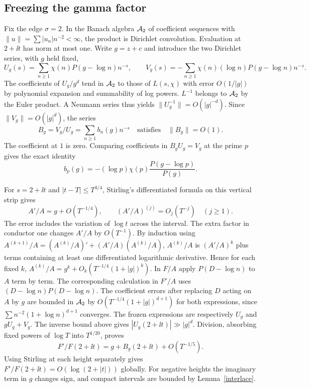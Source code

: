 \documentclass[11pt,letterpaper]{article}
\begin{document}
\subsection{Freezing the gamma factor}
Fix the edge $\sigma=2$. In the Banach algebra $\mathcal A_2$ of coefficient
sequences with $\|u\|=\sum |u_n|n^{-2}<\infty$, the product is Dirichlet
convolution. Evaluation at $2+\ii t$ has norm at most one. Write
$g=z+c$ and introduce the two Dirichlet series, with $g$ held fixed,
\[
 U_g(s)=\sum_{n\ge1}\chi(n)P(g-\log n)n^{-s},\qquad
 V_g(s)=-\sum_{n\ge1}\chi(n)(\log n)P(g-\log n)n^{-s}.
\]
The coefficients of $U_g/g^d$ tend in $\mathcal A_2$ to those of $L(s,\chi)$
with error $O(1/|g|)$ by polynomial expansion and summability of log
powers. $L^{-1}$ belongs to $\mathcal A_2$ by the Euler product. A Neumann
series thus yields $\|U_g^{-1}\|=O(|g|^{-d})$. Since
$\|V_g\|=O(|g|^d)$, the series
\[
 B_g=V_g/U_g=\sum_{n\ge1} b_n(g)n^{-s}
 \quad\text{satisfies}\quad \|B_g\|=O(1).
\]
The coefficient at $1$ is zero. Comparing coefficients in $B_g U_g=V_g$
at the prime $p$ gives the exact identity
\begin{equation}\label{prime}
 b_p(g)=-(\log p)\chi(p)\frac{P(g-\log p)}{P(g)}.
\end{equation}

For $s=2+\ii t$ and $|t-T|\le T^{3/4}$, Stirling's differentiated
formula on this vertical strip gives
\[
  A'/A=g+O(T^{-1/4}),\qquad
  (A'/A)^{(j)}=O_j(T^{-j})\quad(j\ge1).
\]
The error includes the variation of $\log t$ across the interval. The
extra factor in conductor one changes $A'/A$ by $O(T^{-1})$.
By induction using $A^{(k+1)}/A=(A^{(k)}/A)'+(A'/A)(A^{(k)}/A)$,
$A^{(k)}/A$ is $(A'/A)^k$ plus terms containing at least one differentiated
logarithmic derivative. Hence for each fixed $k$,
$A^{(k)}/A=g^k+O_k(T^{-1/4}(1+|g|)^k)$.
In $F/A$ apply $P(D-\log n)$ to $A$ term by term. The corresponding
calculation in $F'/A$ uses $(D-\log n)P(D-\log n)$. The coefficient
errors after replacing $D$ acting on $A$ by $g$ are bounded in $\mathcal A_2$
by $O(T^{-1/4}(1+|g|)^{d+1})$ for both expressions, since
$\sum n^{-2}(1+\log n)^{d+1}$ converges. The frozen expressions are
respectively $U_g$ and $gU_g+V_g$. The inverse bound above gives
$|U_g(2+\ii t)|\gg |g|^d$. Division, absorbing fixed powers of
$\log T$ into $T^{1/20}$, proves
\begin{equation}\label{freeze}
 F'/F(2+\ii t)=g+B_g(2+\ii t)+O(T^{-1/5}).
\end{equation}
Using Stirling at each height separately gives
$F'/F(2+\ii t)=O(\log(2+|t|))$ globally. For negative heights the
imaginary term in $g$ changes sign, and compact intervals are bounded by
Lemma~\ref{interlace}.
\end{document}
